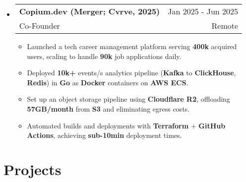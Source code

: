 \documentclass[letterpaper,11pt]{article}
\makeatletter
\newcommand{\resumeItem}[1]{
  \item{
    {#1}
  }
}
\newcommand{\resumeSubheading}[4]{
    \item
    \begin{tabular*}{0.985\textwidth}[t]{l@{\extracolsep{\fill}}r@{\hspace{-0.1in}}}
        {\textbf{#1}} & {#2} \\
        #3 &  #4 \\
    \end{tabular*}\vspace{-5pt}
}
\newcommand{\resumeSubHeadingListStart}{\begin{itemize}[leftmargin=0.00in, rightmargin=-0.2in, label={}]\vspace{3pt}}
\newcommand{\resumeSubHeadingListEnd}{\end{itemize}\vspace{-5pt}}
\newcommand{\resumeItemListStart}{\vspace{3pt}\begin{itemize}[leftmargin=0.15in, rightmargin=0.15in]}
\newcommand{\resumeItemListEnd}{\end{itemize}\vspace{-5pt}}
\makeatother
\begin{document}
\resumeSubHeadingListStart
\resumeSubheading
{Copium.dev (Merger; Cvrve, 2025)} {Jan 2025 - Jun 2025}
{Co-Founder} {Remote}
\resumeItemListStart
\resumeItem{Launched a tech career management platform serving \textbf{400k} acquired users, scaling to handle \textbf{90k} job applications daily.}
\resumeItem{Deployed \textbf{10k+} events/s analytics pipeline (\textbf{Kafka} to \textbf{ClickHouse}, \textbf{Redis}) in \textbf{Go} as \textbf{Docker} containers on \textbf{AWS ECS}.}
\resumeItem{Set up an object storage pipeline using \textbf{Cloudflare R2}, offloading \textbf{57GB/month} from \textbf{S3} and eliminating egress costs.}
\resumeItem{Automated builds and deployments with \textbf{Terraform} + \textbf{GitHub Actions}, achieving \textbf{sub-10min} deployment times.}
\resumeItemListEnd
\resumeSubHeadingListEnd




\section{Projects}
\end{document}
